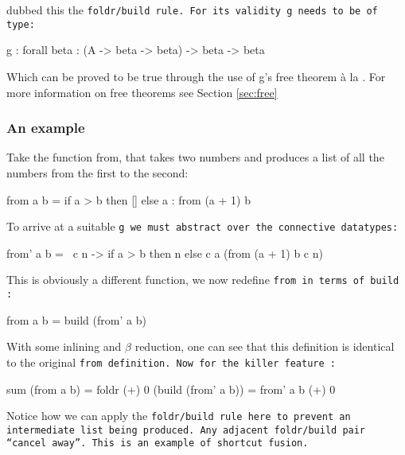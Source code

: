 \cite{Gill1993} dubbed this the \tt{foldr/build} rule. For its validity \tt{g} needs to be of type:
\begin{code}
    g : forall beta : (A -> beta -> beta) -> beta -> beta
\end{code}
Which can be proved to be true through the use of g's free theorem \`a la \cite{Wadler1989}. For more information on free theorems see Section \ref{sec:free}

\subsubsection{An example}
Take the function from, that takes two numbers and produces a list of all the numbers from the first to the second:
\begin{code}
    from a b = if a > b
               then []
               else a : from (a + 1) b
\end{code}
To arrive at a suitable \tt{g} we must abstract over the connective datatypes:
\begin{code}
    from' a b = \ c n  -> if a > b
                          then n
                          else c a (from (a + 1) b c n)
\end{code}
This is obviously a different function, we now redefine \tt{from} in terms of \tt{build} \citep{Gill1993}:
\begin{code}
    from a b = build (from' a b)
\end{code}
With some inlining and $\beta$ reduction, one can see that this definition is identical to the original \tt{from} definition. Now for the killer feature \citep{Gill1993}:
\begin{code}
    sum (from a b)
      = foldr (+) 0 (build (from' a b))
      = from' a b (+) 0
\end{code}
Notice how we can apply the \tt{foldr/build} rule here to prevent an intermediate list being produced. Any adjacent \tt{foldr/build} pair ``cancel away''.
This is an example of shortcut fusion.

